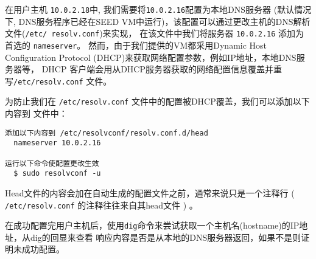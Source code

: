 在用户主机 {\tt 10.0.2.18}中, 我们需要将{\tt 10.0.2.16}配置为本地DNS服务器 (默认情况下, 
DNS服务程序已经在SEED VM中运行)，该配置可以通过更改主机的DNS解析文件(\texttt{/etc/ resolv.conf})来实现，
在该文件中我们将服务器 \texttt{10.0.2.16} 添加为首选的 \texttt{nameserver}。
然而，由于我们提供的VM都采用Dynamic Host Configuration Protocol (DHCP)来获取网络配置参数，例如IP地址，本地DNS服务器等，
DHCP 客户端会用从DHCP服务器获取的网络配置信息覆盖并重写\texttt{/etc/resolv.conf} 文件。


为防止我们在 \texttt{/etc/resolv.conf} 文件中的配置被DHCP覆盖，我们可以添加以下内容到
文件中：

\begin{lstlisting}
添加以下内容到 /etc/resolvconf/resolv.conf.d/head
  nameserver 10.0.2.16

运行以下命令使配置更改生效
  $ sudo resolvconf -u
\end{lstlisting}
 
Head文件的内容会加在自动生成的配置文件之前，通常来说只是一个注释行 ( \texttt{/etc/resolv.conf} 的注释往往来自其head文件 ) 。


在成功配置完用户主机后，使用\texttt{dig}命令来尝试获取一个主机名(hostname)的IP地址，从dig的回显来查看
响应内容是否是从本地的DNS服务器返回，如果不是则证明未成功配置。


